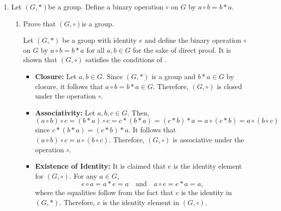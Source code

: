 \begin{enumerate}
\begin{subprove}
\begin{itemize}
      \item \textbf{Operation Preservation:} Let $g_1, g_2 \in G$ be arbitrary.
      Then,
      \[
        \phi(g_1 * g_2) = a (g_1 * g_2) a^{-1} = a g_1 (a^{-1} a) g_2 a^{-1} = (a g_1 a^{-1}) * (a g_2 a^{-1}) = \phi(g_1) * \phi(g_2).
      \]
      Therefore, $\phi$ preserves the group operation.
    \end{itemize}
    
    Since $\phi$ is a bijection and preserves the group operation,
    it is concluded by definition of  that $\phi$ is an isomorphism from $G$ to $G$.
  \end{subprove}



  \newpage
  



  \item Let $(G, *)$be a group. Define a binary operation $\circ$ on $G$ by $a \circ b=b * a$.
  \begin{enumerate}
    \item Prove that $(G, \circ)$is a group.
    \begin{subprove}
      Let $(G, *)$ be a group with identity $e$ and define the binary operation $\circ$ on $G$ by $a \circ b = b * a$ for all $a, b \in G$ for the sake of direct proof.
      It is shown that $(G, \circ)$ satisfies the conditions of .
      
      \begin{itemize}
        \item \textbf{Closure:} Let $a, b \in G$.
        Since $(G, *)$ is a group and $b * a \in G$ by closure,
        it follows that $a \circ b = b * a \in G$.
        Therefore, $(G, \circ)$ is closed under the operation $\circ$.
        
        \item \textbf{Associativity:} Let $a, b, c \in G$.
        Then,
        \[
          (a \circ b) \circ c = (b * a) \circ c = c * (b * a) = (c * b) * a = a \circ (c * b)=a \circ (b \circ c)
        \]
        since $c * (b * a) = (c * b) * a$. It follows that $(a \circ b) \circ c = a \circ (b \circ c)$.
        Therefore, $(G, \circ)$ is associative under the operation $\circ$.
        
        \item \textbf{Existence of Identity:} It is claimed that $e$ is the identity element for $(G, \circ)$.
        For any $a \in G$,
        \[
          e \circ a = a * e = a \quad \text{and} \quad a \circ e = e * a = a,
        \]
        where the equalities follow from the fact that $e$ is the identity in $(G, *)$.
        Therefore, $e$ is the identity element in $(G, \circ)$.
        

\end{itemize}
\end{subprove}
\end{enumerate}
\end{enumerate}
